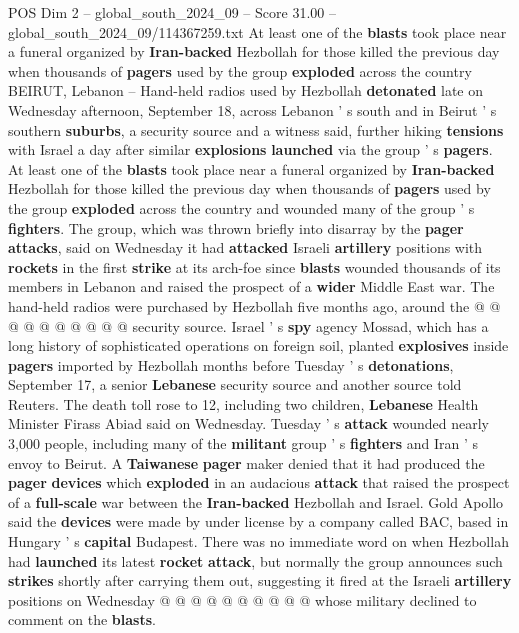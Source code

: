 \begin{textsample}{POS Dim 2 – global\_south\_2024\_09 – Score 31.00 – global\_south\_2024\_09/114367259.txt}  \label{ex:f2_pos_038}
At least one of the \textbf{blasts} took place near a funeral organized by \textbf{Iran-backed} Hezbollah for those killed the previous day when thousands of \textbf{pagers} used by the group \textbf{exploded} across the country BEIRUT, Lebanon -- Hand-held radios used by Hezbollah \textbf{detonated} late on Wednesday afternoon, September 18, across Lebanon ' s south and in Beirut ' s southern \textbf{suburbs}, a security source and a witness said, further hiking \textbf{tensions} with Israel a day after similar \textbf{explosions} \textbf{launched} via the group ' s \textbf{pagers}.
At least one of the \textbf{blasts} took place near a funeral organized by \textbf{Iran-backed} Hezbollah for those killed the previous day when thousands of \textbf{pagers} used by the group \textbf{exploded} across the country and wounded many of the group ' s \textbf{fighters}.
The group, which was thrown briefly into disarray by the \textbf{pager} \textbf{attacks}, said on Wednesday it had \textbf{attacked} Israeli \textbf{artillery} positions with \textbf{rockets} in the first \textbf{strike} at its arch-foe since \textbf{blasts} wounded thousands of its members in Lebanon and raised the prospect of a \textbf{wider} Middle East war.
The hand-held radios were purchased by Hezbollah five months ago, around the @ @ @ @ @ @ @ @ @ @ security source.
Israel ' s \textbf{spy} agency Mossad, which has a long history of sophisticated operations on foreign soil, planted \textbf{explosives} inside \textbf{pagers} imported by Hezbollah months before Tuesday ' s \textbf{detonations}, September 17, a senior \textbf{Lebanese} security source and another source told Reuters.
The death toll rose to 12, including two children, \textbf{Lebanese} Health Minister Firass Abiad said on Wednesday.
Tuesday ' s \textbf{attack} wounded nearly 3,000 people, including many of the \textbf{militant} group ' s \textbf{fighters} and Iran ' s envoy to Beirut.
A \textbf{Taiwanese} \textbf{pager} maker denied that it had produced the \textbf{pager} \textbf{devices} which \textbf{exploded} in an audacious \textbf{attack} that raised the prospect of a \textbf{full-scale} war between the \textbf{Iran-backed} Hezbollah and Israel.
Gold Apollo said the \textbf{devices} were made by under license by a company called BAC, based in Hungary ' s \textbf{capital} Budapest.
There was no immediate word on when Hezbollah had \textbf{launched} its latest \textbf{rocket} \textbf{attack}, but normally the group announces such \textbf{strikes} shortly after carrying them out, suggesting it fired at the Israeli \textbf{artillery} positions on Wednesday @ @ @ @ @ @ @ @ @ @ whose military declined to comment on the \textbf{blasts}.

\end{textsample}

